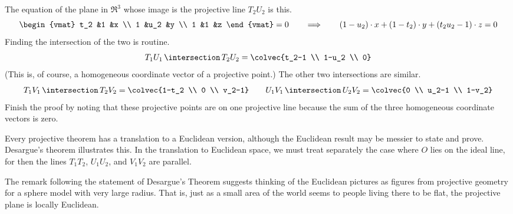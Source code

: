 The equation of the 
plane in $\Re^3$ whose image is the projective line $T_2U_2$ is this.
\begin{equation*}
  \begin{vmat}
    t_2  &1    &x  \\
    1    &u_2  &y  \\
    1    &1    &z
  \end{vmat}=0
  \qquad
  \Longrightarrow
  \qquad
  (1-u_2)\cdot x+(1-t_2)\cdot y+(t_2u_2-1)\cdot z=0
\end{equation*}
Finding the intersection of the two is routine.
\begin{equation*}
  T_1U_1\,\intersection\, T_2U_2
  =\colvec{t_2-1 \\ 1-u_2 \\ 0}
\end{equation*}
(This is, of course, a homogeneous coordinate vector of a projective point.)
The other two intersections are similar.
\begin{equation*}
  T_1V_1\,\intersection\, T_2V_2
  =\colvec{1-t_2 \\ 0 \\ v_2-1}
  \qquad
  U_1V_1\,\intersection\, U_2V_2
  =\colvec{0 \\ u_2-1 \\ 1-v_2}
\end{equation*}
Finish the proof by noting that
these projective points are on one projective line because
the sum of the three homogeneous coordinate vectors is zero.

Every projective theorem has a translation to a Euclidean version, although 
the Euclidean result may be messier to state and prove.
Desargue's theorem illustrates this.
In the translation to Euclidean space, we must treat separately the case
where $O$ lies on the ideal line, for then the lines
$T_1T_2$, $U_1U_2$, and $V_1V_2$ are parallel.

The remark
following the statement of Desargue's Theorem suggests thinking
of the Euclidean pictures as figures from projective geometry 
for a sphere model with very large radius.
That is, 
just as a small area of the world seems to people living there to be flat,
the projective plane is locally Euclidean.

